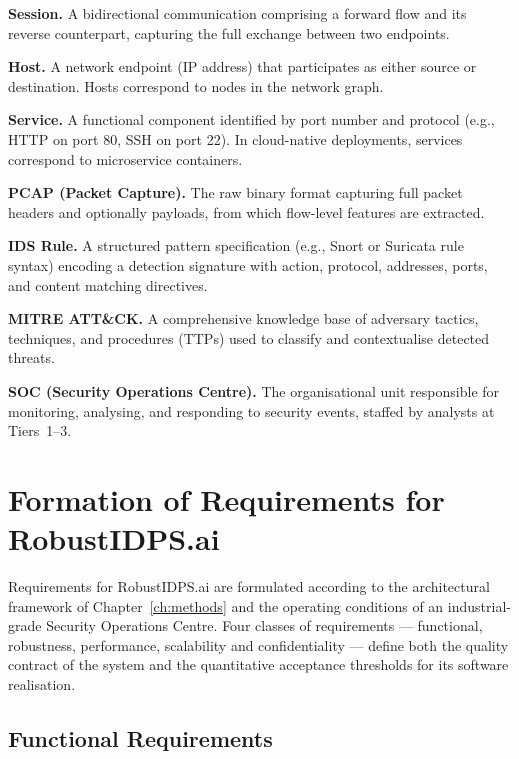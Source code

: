 \noindent\textbf{Session.} A bidirectional communication comprising a forward flow and its reverse counterpart, capturing the full exchange between two endpoints.

\noindent\textbf{Host.} A network endpoint (IP address) that participates as either source or destination. Hosts correspond to nodes in the network graph.

\noindent\textbf{Service.} A functional component identified by port number and protocol (e.g., HTTP on port 80, SSH on port 22). In cloud-native deployments, services correspond to microservice containers.

\noindent\textbf{PCAP (Packet Capture).} The raw binary format capturing full packet headers and optionally payloads, from which flow-level features are extracted.

\noindent\textbf{IDS Rule.} A structured pattern specification (e.g., Snort or Suricata rule syntax) encoding a detection signature with action, protocol, addresses, ports, and content matching directives.

\noindent\textbf{MITRE ATT\&CK.} A comprehensive knowledge base of adversary tactics, techniques, and procedures (TTPs) used to classify and contextualise detected threats.

\noindent\textbf{SOC (Security Operations Centre).} The organisational unit responsible for monitoring, analysing, and responding to security events, staffed by analysts at Tiers~1--3.

\section{Formation of Requirements for RobustIDPS.ai}
\label{sec:requirements}

Requirements for RobustIDPS.ai are formulated according to the architectural framework of Chapter~\ref{ch:methods} and the operating conditions of an industrial-grade Security Operations Centre. Four classes of requirements --- functional, robustness, performance, scalability and confidentiality --- define both the quality contract of the system and the quantitative acceptance thresholds for its software realisation.

\subsection{Functional Requirements}
\label{subsec:req_functional}

